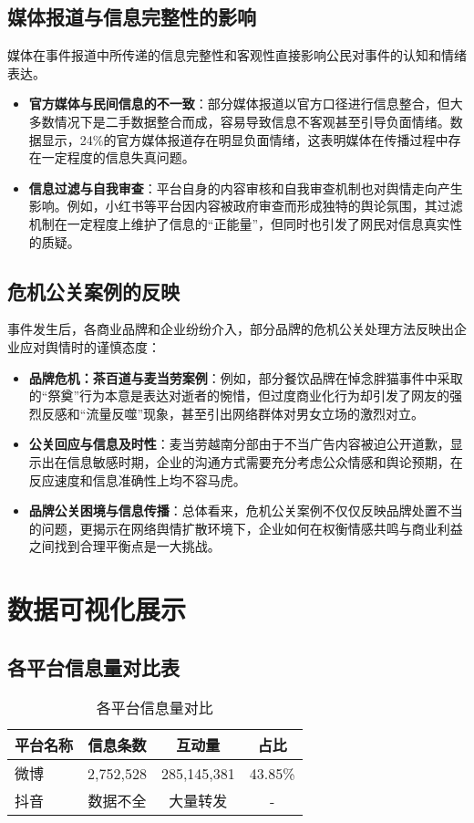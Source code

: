 \documentclass{article}
\begin{document}
\subsection{媒体报道与信息完整性的影响}
媒体在事件报道中所传递的信息完整性和客观性直接影响公民对事件的认知和情绪表达。
\begin{itemize}
    \item \textbf{官方媒体与民间信息的不一致}：部分媒体报道以官方口径进行信息整合，但大多数情况下是二手数据整合而成，容易导致信息不客观甚至引导负面情绪。数据显示，24\%的官方媒体报道存在明显负面情绪，这表明媒体在传播过程中存在一定程度的信息失真问题。
    \item \textbf{信息过滤与自我审查}：平台自身的内容审核和自我审查机制也对舆情走向产生影响。例如，小红书等平台因内容被政府审查而形成独特的舆论氛围，其过滤机制在一定程度上维护了信息的“正能量”，但同时也引发了网民对信息真实性的质疑。
\end{itemize}

\subsection{危机公关案例的反映}
事件发生后，各商业品牌和企业纷纷介入，部分品牌的危机公关处理方法反映出企业应对舆情时的谨慎态度：
\begin{itemize}
    \item \textbf{品牌危机：茶百道与麦当劳案例}：例如，部分餐饮品牌在悼念胖猫事件中采取的“祭奠”行为本意是表达对逝者的惋惜，但过度商业化行为却引发了网友的强烈反感和“流量反噬”现象，甚至引出网络群体对男女立场的激烈对立。
    \item \textbf{公关回应与信息及时性}：麦当劳越南分部由于不当广告内容被迫公开道歉，显示出在信息敏感时期，企业的沟通方式需要充分考虑公众情感和舆论预期，在反应速度和信息准确性上均不容马虎。
    \item \textbf{品牌公关困境与信息传播}：总体看来，危机公关案例不仅仅反映品牌处置不当的问题，更揭示在网络舆情扩散环境下，企业如何在权衡情感共鸣与商业利益之间找到合理平衡点是一大挑战。
\end{itemize}

\section{数据可视化展示}
\subsection{各平台信息量对比表}
\begin{table}[htbp]
\centering
\caption{各平台信息量对比}
\begin{tabular}{lccc}
\toprule
平台名称 & 信息条数 & 互动量 & 占比 \\
\midrule
微博 & 2,752,528 & 285,145,381 & 43.85\% \\
抖音 & 数据不全 & 大量转发 & - \\
\bottomrule
\end{tabular}
\end{table}
\end{document}
